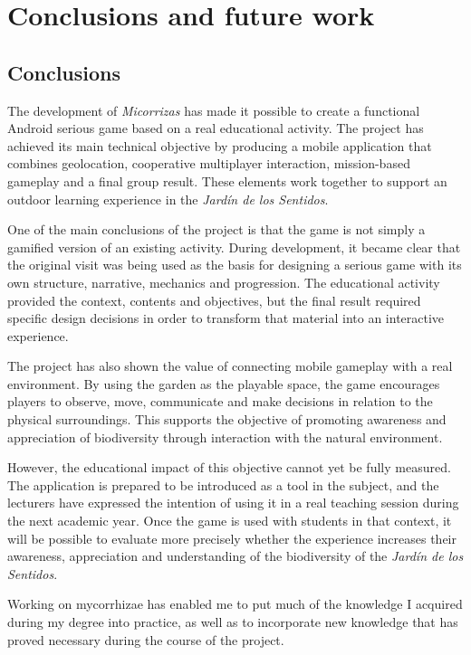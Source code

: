 \chapter{Conclusions and future work}

\section{Conclusions}
The development of \textit{Micorrizas} has made it possible to create a functional Android serious game based on a real educational activity. The project has achieved its main technical objective by producing a mobile application that combines geolocation, cooperative multiplayer interaction, mission-based gameplay and a final group result. These elements work together to support an outdoor learning experience in the \textit{Jardín de los Sentidos}.

One of the main conclusions of the project is that the game is not simply a gamified version of an existing activity. During development, it became clear that the original visit was being used as the basis for designing a serious game with its own structure, narrative, mechanics and progression. The educational activity provided the context, contents and objectives, but the final result required specific design decisions in order to transform that material into an interactive experience.

The project has also shown the value of connecting mobile gameplay with a real environment. By using the garden as the playable space, the game encourages players to observe, move, communicate and make decisions in relation to the physical surroundings. This supports the objective of promoting awareness and appreciation of biodiversity through interaction with the natural environment.

However, the educational impact of this objective cannot yet be fully measured. The application is prepared to be introduced as a tool in the subject, and the lecturers have expressed the intention of using it in a real teaching session during the next academic year. Once the game is used with students in that context, it will be possible to evaluate more precisely whether the experience increases their awareness, appreciation and understanding of the biodiversity of the \textit{Jardín de los Sentidos}.

Working on mycorrhizae has enabled me to put much of the knowledge I acquired during my degree into practice, as well as to incorporate new knowledge that has proved necessary during the course of the project.

